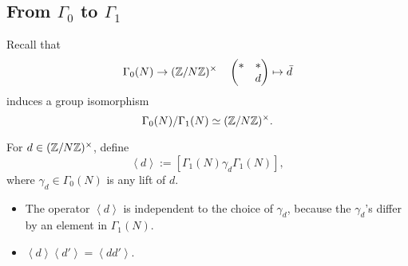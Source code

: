 \subsection{From \texorpdfstring{$\Gamma_0$ to $\Gamma_1$}{Gamma0 to Gamma1}}

Recall that \[\Gamma_0(N)\to(\mathbb{Z}/N\mathbb{Z})^\times\quad \begin{pmatrix}
    *&*\\*&d
\end{pmatrix}\mapsto \bar{d}\] induces a group isomorphism \[\Gamma_0(N)/\Gamma_1(N)\simeq (\mathbb{Z}/N\mathbb{Z})^\times.\]
\begin{definition}
    For $d\in(\mathbb{Z}/N\mathbb{Z})^\times$, define \[\left<d\right> := [\Gamma_1(N)\gamma_d\Gamma_1(N)],\]
    where $\gamma_d\in\Gamma_0(N)$ is any lift of $d$.
\end{definition}
\begin{itemize}
    \item The operator $\left<d\right>$ is independent to the choice of $\gamma_d$, because the $\gamma_d$'s differ by an element in $\Gamma_1(N)$.
    \item $\left< d\right>\left<d'\right> = \left<dd'\right>$.
\end{itemize}


